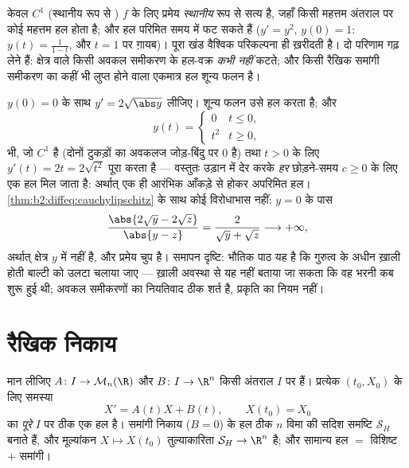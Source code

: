 \begin{remark}
केवल $C^1$ (स्थानीय रूप से ) $f$ के लिए प्रमेय \emph{स्थानीय} रूप
से सत्य है, जहाँ किसी महत्तम  अंतराल पर कोई महत्तम हल होता है; और हल
परिमित समय में फट सकते हैं ($y' = y^2$, $y(0) = 1$: $y(t)
= \frac{1}{1-t}$, और $t = 1$ पर ग़ायब)। पूरा खंड
वैश्विक  परिकल्पना ही ख़रीदती है। दो परिणाम गढ़ लेने  हैं:
 क्षेत्र वाले किसी अवकल समीकरण के हल-वक्र \emph{कभी नहीं} कटते;
और किसी रैखिक समांगी समीकरण का कहीं भी लुप्त होने वाला एकमात्र हल शून्य
फलन है।
\end{remark}

\begin{example}[अद्वितीयता एक प्रमेय है: एक रिसता हुआ क्षेत्र]\label{ex:b2:diffeq:leaky}
$y(0) = 0$ के साथ $y' = 2\sqrt{\abs y}$ लीजिए। शून्य फलन उसे हल करता है; और
\[
y(t) = \begin{cases} 0 & t \leq 0,\\ t^2 & t \geq 0,
\end{cases}
\]
भी, जो $C^1$ है (दोनों टुकड़ों का अवकलज जोड़-बिंदु पर $0$ है) तथा $t > 0$ के लिए
$y'(t) = 2t = 2\sqrt{t^2}$ पूरा करता है --- वस्तुतः उड़ान में देर करके \emph{हर} छोड़ने-समय $c \geq 0$
के लिए एक हल मिल जाता है: अर्थात् एक ही आरंभिक आँकड़े से होकर अपरिमित हल।
\cref{thm:b2:diffeq:cauchylipschitz} के साथ कोई विरोधाभास नहीं: $y = 0$ के पास
\[
\frac{\abs{2\sqrt y - 2\sqrt z}}{\abs{y - z}}
= \frac{2}{\sqrt y + \sqrt z} \longrightarrow +\infty ,
\]
अर्थात् क्षेत्र $y$ में  नहीं है, और प्रमेय चुप है। समापन
दृष्टि: भौतिक पाठ यह है कि गुरुत्व के अधीन ख़ाली होती बाल्टी को उलटा
चलाया जाए --- ख़ाली अवस्था से यह नहीं बताया जा सकता कि वह भरनी कब शुरू
हुई थी; अवकल समीकरणों का नियतिवाद ठीक  शर्त है, प्रकृति का नियम
नहीं।
\end{example}

\section{रैखिक निकाय}

\begin{theorem}[रैखिक निकायों की संरचना]\label{thm:b2:diffeq:linear}
मान लीजिए $A \colon I \to \mathcal{M}_n(\R)$ और $B \colon I \to \R^n$ किसी अंतराल $I$ पर  हैं। प्रत्येक $(t_0, X_0)$ के लिए
समस्या
\[
X' = A(t)X + B(t), \qquad X(t_0) = X_0
\]
का \emph{पूरे} $I$ पर ठीक एक हल है। समांगी निकाय ($B = 0$) के हल ठीक $n$ विमा
की सदिश समष्टि $\mathcal{S}_H$ बनाते हैं, और मूल्यांकन $X \mapsto X(t_0)$ तुल्याकारिता $\mathcal{S}_H \to \R^n$ है; और
सामान्य हल $=$ विशिष्ट $+$ समांगी।
\end{theorem}

